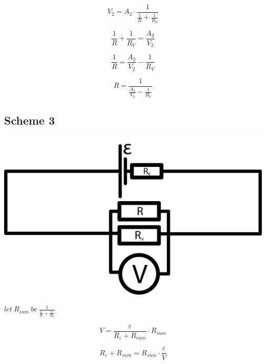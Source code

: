 \documentclass[11pt]{memoir}
\begin{document}
    \begin{equation*}
        V_2 = A_2 \cdot \frac{1}{\frac{1}{R} + \frac{1}{R_V}}
    \end{equation*}

    \begin{equation*}
        \frac{1}{R} + \frac{1}{R_V} = \frac{A_2}{V_2}
    \end{equation*}

    \begin{equation*}
        \frac{1}{R} = \frac{A_2}{V_2} - \frac{1}{R_V}
    \end{equation*}

    \begin{equation}\label{eq:equation2}
        R = \frac{1}{\frac{A_2}{V_2} - \frac{1}{R_V}}
    \end{equation}


    \newpage

    \subsection{Scheme 3}\label{subsec:scheme-3}

    \includegraphics[width=\linewidth]{../schemes/Scheme3.png}

    $let~ R_{sum} ~be~ \frac{1}{\frac{1}{R} + \frac{1}{R_V}}$

    \begin{equation*}
        V = \frac{\varepsilon}{R_\varepsilon + R_{sum}} \cdot R_{sum}
    \end{equation*}

    \begin{equation*}
        R_\varepsilon + R_{sum} = R_{sum} \cdot \frac{\varepsilon}{V}
    \end{equation*}
\end{document}
